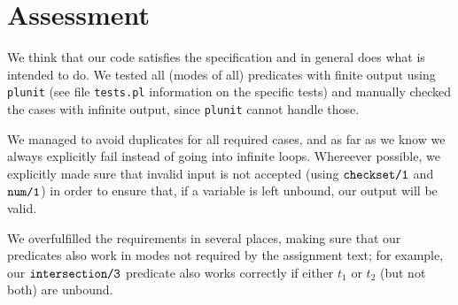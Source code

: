 \documentclass[a4paper]{article}
\newcommand{\pfuncn}[2]{\textnormal{\texttt{#1/#2}}\xspace}
\begin{document}
\section*{Assessment}
We think that our code satisfies the specification and in general does what is intended to do. We tested all (modes of all) predicates with finite output using \texttt{plunit} (see file \texttt{tests.pl} information on the specific tests) and manually checked the cases with infinite output, since \texttt{plunit} cannot handle those. 

We managed to avoid duplicates for all required cases, and as far as we know we always explicitly fail instead of going into infinite loops. Whereever possible, we explicitly made sure that invalid input is not accepted (using $\pfuncn{checkset}{1}$ and $\pfuncn{num}{1}$) in order to ensure that, if a variable is left unbound, our output will be valid. 

We overfulfilled the requirements in several places, making sure that our predicates also work in modes not required by the assignment text; for example, our $\pfuncn{intersection}{3}$ predicate also works correctly if either $t_1$ or $t_2$ (but not both) are unbound.
\end{document}
